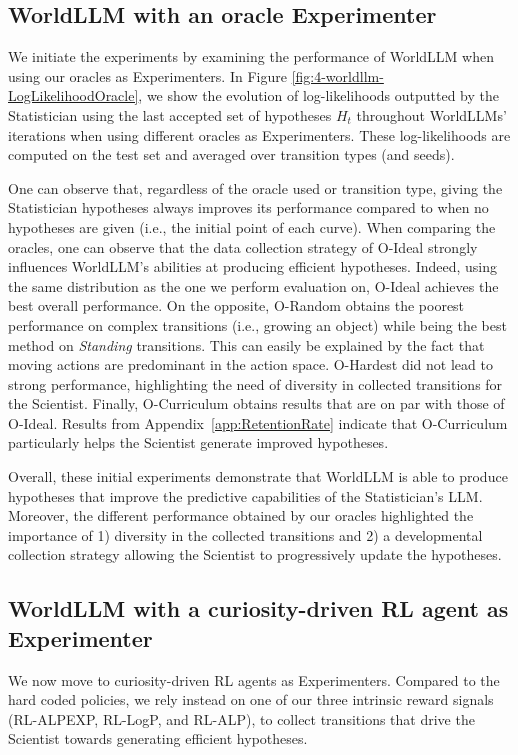 \documentclass{article}
\begin{document}
\subsection{WorldLLM with an oracle Experimenter}
We initiate the experiments by examining the performance of WorldLLM when using our oracles as Experimenters. In Figure \ref{fig:4-worldllm-LogLikelihoodOracle}, we show the evolution of log-likelihoods outputted by the Statistician using the last accepted set of hypotheses $H_t$ throughout WorldLLMs' iterations when using different oracles as Experimenters. These log-likelihoods are computed on the test set and averaged over transition types (and seeds).

One can observe that, regardless of the oracle used or transition type, giving the Statistician hypotheses always improves its performance compared to when no hypotheses are given (i.e., the initial point of each curve). When comparing the oracles, one can observe that the data collection strategy of O-Ideal strongly influences WorldLLM's abilities at producing efficient hypotheses. Indeed, using the same distribution as the one we perform evaluation on, O-Ideal achieves the best overall performance. On the opposite, O-Random obtains the poorest performance on complex transitions (i.e., growing an object) while being the best method on \textit{Standing} transitions. This can easily be explained by the fact that moving actions are predominant in the action space. O-Hardest did not lead to strong performance, highlighting the need of diversity in collected transitions for the Scientist. Finally, O-Curriculum obtains results that are on par with those of O-Ideal. Results from Appendix~\ref{app:RetentionRate} indicate that O-Curriculum particularly helps the Scientist generate improved hypotheses.

Overall, these initial experiments demonstrate that WorldLLM is able to produce hypotheses that improve the predictive capabilities of the Statistician's LLM. Moreover, the different performance obtained by our oracles highlighted the importance of 1) diversity in the collected transitions and 2) a developmental collection strategy allowing the Scientist to progressively update the hypotheses. 

\subsection{WorldLLM with a curiosity-driven RL agent as Experimenter} \label{sec:worldllm-rl}
We now move to curiosity-driven RL agents as Experimenters. Compared to the hard coded policies, we rely instead on one of our three intrinsic reward signals (RL-ALPEXP, RL-LogP, and RL-ALP), to collect transitions that drive the Scientist towards generating efficient hypotheses.
\end{document}
